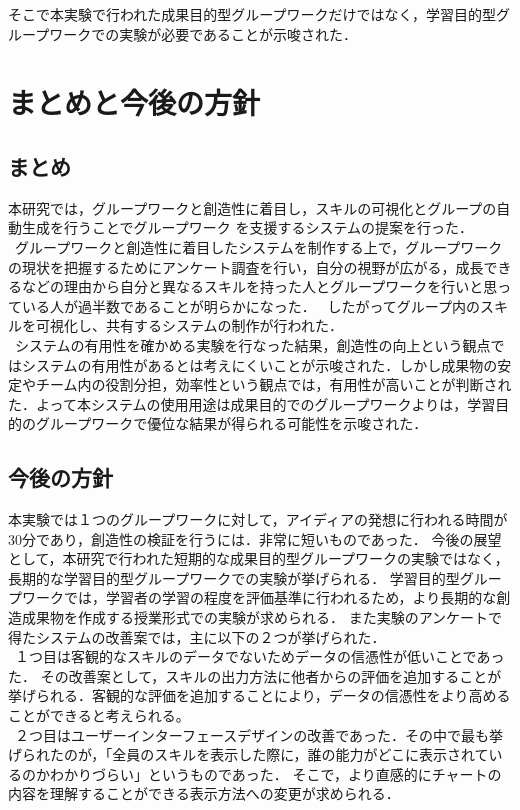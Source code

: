 \documentclass{funthesis}
\begin{document}
そこで本実験で行われた成果目的型グループワークだけではなく，学習目的型グループワークでの実験が必要であることが示唆された．


\chapter{まとめと今後の方針}
\section{まとめ}
本研究では，グループワークと創造性に着目し，スキルの可視化とグループの自動生成を行うことでグループワーク
を支援するシステムの提案を行った．\\
\ グループワークと創造性に着目したシステムを制作する上で，グループワークの現状を把握するためにアンケート調査を行い，自分の視野が広がる，成長できるなどの理由から自分と異なるスキルを持った人とグループワークを行いと思っている人が過半数であることが明らかになった．
\ したがってグループ内のスキルを可視化し、共有するシステムの制作が行われた．\\
\ システムの有用性を確かめる実験を行なった結果，創造性の向上という観点ではシステムの有用性があるとは考えにくいことが示唆された．しかし成果物の安定やチーム内の役割分担，効率性という観点では，有用性が高いことが判断された．よって本システムの使用用途は成果目的でのグループワークよりは，学習目的のグループワークで優位な結果が得られる可能性を示唆された．

\section{今後の方針}
本実験では１つのグループワークに対して，アイディアの発想に行われる時間が30分であり，創造性の検証を行うには．非常に短いものであった．
今後の展望として，本研究で行われた短期的な成果目的型グループワークの実験ではなく，長期的な学習目的型グループワークでの実験が挙げられる．
学習目的型グループワークでは，学習者の学習の程度を評価基準に行われるため，より長期的な創造成果物を作成する授業形式での実験が求められる．
また実験のアンケートで得たシステムの改善案では，主に以下の２つが挙げられた．\\
\ １つ目は客観的なスキルのデータでないためデータの信憑性が低いことであった．
その改善案として，スキルの出力方法に他者からの評価を追加することが挙げられる．客観的な評価を追加することにより，データの信憑性をより高めることができると考えられる。\\
\ ２つ目はユーザーインターフェースデザインの改善であった．その中で最も挙げられたのが，「全員のスキルを表示した際に，誰の能力がどこに表示されているのかわかりづらい」というものであった．
そこで，より直感的にチャートの内容を理解することができる表示方法への変更が求められる．
\end{document}
